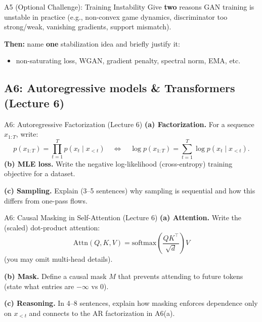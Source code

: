 \documentclass[aspectratio=169]{beamer}
\begin{document}
\begin{frame}{A5 (Optional Challenge): Training Instability}
\small
Give \textbf{two} reasons GAN training is unstable in practice (e.g., non-convex game dynamics, discriminator too strong/weak, vanishing gradients, support mismatch).
\vspace{0.4em}

\textbf{Then:} name \textbf{one} stabilization idea and briefly justify it:
\begin{itemize}
  \item non-saturating loss, WGAN, gradient penalty, spectral norm, EMA, etc.
\end{itemize}
\end{frame}

\subsection{A6: Autoregressive models \& Transformers (Lecture 6)}

\begin{frame}{A6: Autoregressive Factorization (Lecture 6)}
\small
\textbf{(a) Factorization.} For a sequence $x_{1:T}$, write:
\[
p(x_{1:T})=\prod_{t=1}^T p(x_t\mid x_{<t})
\quad \Longleftrightarrow \quad
\log p(x_{1:T})=\sum_{t=1}^T \log p(x_t\mid x_{<t}).
\]
\textbf{(b) MLE loss.} Write the negative log-likelihood (cross-entropy) training objective for a dataset.
\vspace{0.5em}

\textbf{(c) Sampling.} Explain (3--5 sentences) why sampling is sequential and how this differs from one-pass flows.
\end{frame}

\begin{frame}{A6: Causal Masking in Self-Attention (Lecture 6)}
\small
\textbf{(a) Attention.} Write the (scaled) dot-product attention:
\[
\mathrm{Attn}(Q,K,V)=\mathrm{softmax}\!\left(\frac{QK^\top}{\sqrt{d}}\right)V
\]
(you may omit multi-head details).
\vspace{0.4em}

\textbf{(b) Mask.} Define a causal mask $M$ that prevents attending to future tokens (state what entries are $-\infty$ vs $0$).
\vspace{0.4em}

\textbf{(c) Reasoning.} In 4--8 sentences, explain how masking enforces dependence only on $x_{<t}$ and connects to the AR factorization in A6(a).
\end{frame}
\end{document}
